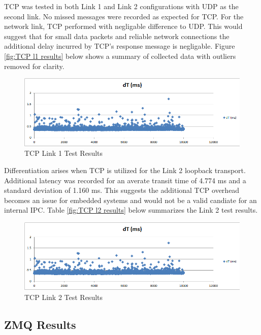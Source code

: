 TCP was tested in both Link 1 and Link 2 configurations with UDP as the second link. No missed messages were recorded as expected for TCP. For the network link, TCP performed with negligable difference to UDP. This would suggest that for small data packets and reliable network connections the additional delay incurred by TCP's response message is negligable. Figure \ref{fig:TCP l1 results} below shows a summary of collected data with outliers removed for clarity.

\begin{figure}[thpb]
 \centering
 \includegraphics[width=1.0\columnwidth]{./images/tcp2udp.png}
  \caption{TCP Link 1 Test Results}  
  \label{fig:TCP L1 results}
\end{figure} 

Differentiation arises when TCP is utilized for the Link 2 loopback transport. Additional latency was recorded for an averate transit time of 4.774 ms and a standard deviation of  1.160 ms. This suggests the additional TCP overhead becomes an issue for embedded systems and would not be a valid candiate for an internal IPC. Table \ref{fig:TCP l2 results} below summarizes the Link 2 test results.

\begin{figure}[thpb]
 \centering
 \includegraphics[width=1.0\columnwidth]{./images/tcp2udp.png}
  \caption{TCP Link 2 Test Results}  
  \label{fig:TCP L2 results}
\end{figure} 

\subsection{ZMQ Results}

